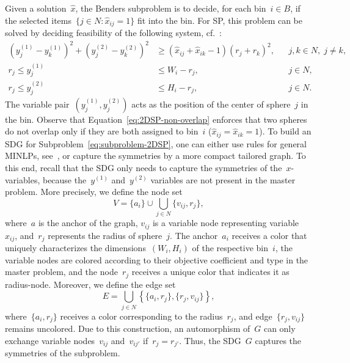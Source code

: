 \documentclass[a4paper,10pt]{article}
\newcommand{\fixed}[1]{\hat{ #1 }}
\newcommand{\spherepack}{SP\xspace}
\newcommand{\brackets}[1]{\left\{ #1 \right\}}
\theoremstyle{definition}
\begin{document}
Given a solution~$\fixed{x}$, the Benders subproblem is to decide, for each bin~$i \in B$, if the selected items~$\{j \in N: \fixed{x}_{ij} = 1\}$ fit into the bin.
For \spherepack, this problem can be solved by deciding feasibility of the following system,  cf.~\cite{khajavirad2024circle}:
%
\begin{subequations}
  \label{eq:subproblem-2DSP}
  \begin{align}
    \left(y^{(1)}_j - y^{(1)}_k\right)^2 + \left(y^{(2)}_j - y^{(2)}_k\right)^2 &\geq (\fixed{x}_{ij} + \fixed{x}_{ik} - 1)(r_j + r_k)^2, && j, k\in N,\; j \neq k, \label{eq:2DSP-non-overlap}\\
    r_j \leq y^{(1)}_j &\leq W_i - r_j, && j\in N, \\
    r_j \leq y^{(2)}_j &\leq H_i - r_j, && j\in N.
\end{align}
\end{subequations}
%
The variable pair~$\left(y^{(1)}_j, y^{(2)}_j\right)$ acts as the position of the center of sphere~$j$ in the bin.
Observe that Equation~\eqref{eq:2DSP-non-overlap} enforces that two spheres do not overlap only if they are both assigned to bin~$i$ ($\fixed{x}_{ij} = \fixed{x}_{ik} = 1$).
To build an SDG for Subproblem~\eqref{eq:subproblem-2DSP}, one can either use rules for general MINLPs, see~\cite{liberti2012reformulations}, or capture the symmetries by a more compact tailored graph.
To this end, recall that the SDG only needs to capture the symmetries of the~$x$-variables, because the~$y^{(1)}$ and~$y^{(2)}$ variables are not present in the master problem.
More precisely, we define the node set
\[
  V = \{a_i\} \cup \bigcup_{j \in N} \{v_{ij}, r_j\},
\]
where~$a$ is the anchor of the graph, $v_{ij}$ is a variable node representing variable~$x_{ij}$, and~$r_j$ represents the radius of sphere~$j$.
The anchor~$a_i$ receives a color that uniquely characterizes the dimensions~$(W_i,H_i)$ of the respective bin~$i$, the variable nodes are colored according to their objective coefficient and type in the master problem, and the node~$r_j$ receives a unique color that indicates it as radius-node.
Moreover, we define the edge set
\[
  E = \bigcup_{j \in N} \brackets{\{a_i,r_j\}, \{r_j,v_{ij}\}},
\]
where~$\{a_i,r_j\}$ receives a color corresponding to the radius~$r_j$, and edge~$\{r_j,v_{ij}\}$ remains uncolored.
Due to this construction, an automorphism of~$G$ can only exchange variable nodes~$v_{ij}$ and~$v_{ij'}$ if~$r_j = r_{j'}$.
Thus, the SDG~$G$ captures the symmetries of the subproblem.
\end{document}
